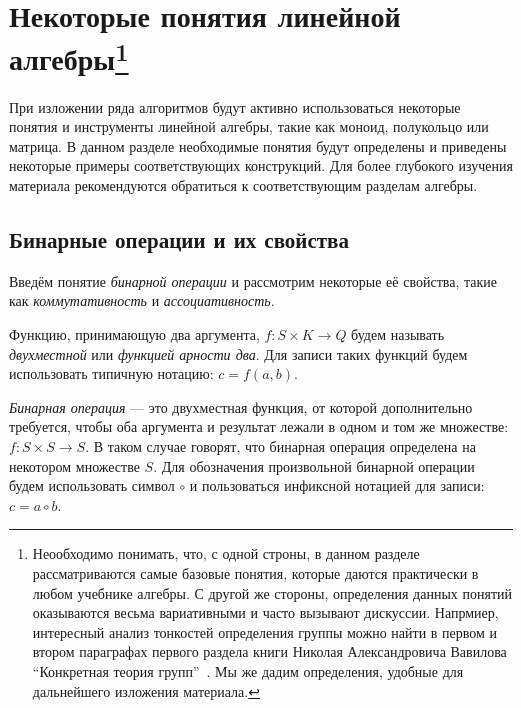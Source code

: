 \chapter[Некоторые понятия линейной алгебры]{Некоторые понятия линейной алгебры\footnote{Неообходимо понимать, что, с одной строны, в данном разделе рассматриваются самые базовые понятия, которые даются практически в любом учебнике алгебры. С другой же стороны, определения данных понятий оказываются весьма вариативными и часто вызывают дискуссии. Напрмиер, интересный анализ тонкостей определения группы можно найти в первом и втором параграфах первого раздела книги Николая Александровича Вавилова ``Конкретная теория групп''~\cite{VavilovGroups}. Мы же дадим определения, удобные для дальнейшего изложения материала.}}\label{chpt:LinAlIntro}

При изложении ряда алгоритмов будут активно использоваться некоторые понятия и инструменты линейной алгебры, такие как моноид, полукольцо или матрица.
В данном разделе необходимые понятия будут определены и приведены некоторые примеры соответствующих конструкций. Для более глубокого изучения материала рекомендуются обратиться к соответствующим разделам алгебры.


\section{Бинарные операции и их свойства}


Введём понятие \textit{бинарной операции} и рассмотрим некоторые её свойства, такие как \textit{коммутативность} и \textit{ассоциативность}.

\begin{definition}
	Функцию, принимающую два аргумента, $f: S \times K \to Q$ будем называть \emph{двухместной} или \emph{функцией арности два}.
Для записи таких функций будем использовать типичную нотацию: $c = f(a,b)$.
\end{definition}


\begin{definition}
\emph{Бинарная операция} --- это двухместная функция, от которой дополнительно требуется, чтобы оба аргумента и результат лежали в одном и том же множестве: $f: S \times S \to S$. В таком случае говорят, что бинарная операция определена на некотором множестве $S$. Для обозначения произвольной бинарной операции будем использовать символ $\circ$ и пользоваться инфиксной нотацией для записи: $c = a \circ b$.
\end{definition}





